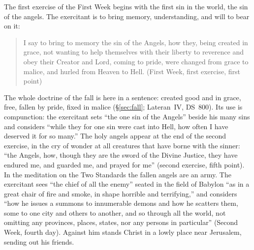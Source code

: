 The first exercise of the First Week begins with the first sin in the
world, the sin of the angels. The exercitant is to bring memory,
understanding, and will to bear on it:
\begin{quote}
I say to bring to memory the sin of the Angels, how they, being created in
grace, not wanting to help themselves with their liberty to reverence and
obey their Creator and Lord, coming to pride, were changed from grace to
malice, and hurled from Heaven to Hell. (First Week, first exercise, first
point)
\end{quote}
The whole doctrine of the fall is here in a sentence: created good and in
grace, free, fallen by pride, fixed in malice (\S\ref{sec:fall}; Lateran~IV,
DS~800). Its use is compunction: the exercitant sets ``the one sin of the
Angels'' beside his many sins and considers ``while they for one sin were
cast into Hell, how often I have deserved it for so many.'' The holy angels
appear at the end of the second exercise, in the cry of wonder at all
creatures that have borne with the sinner: ``the Angels, how, though they are
the sword of the Divine Justice, they have endured me, and guarded me, and
prayed for me'' (second exercise, fifth point). In the meditation on the Two
Standards the fallen angels are an army. The exercitant sees ``the chief of
all the enemy'' seated in the field of Babylon ``as in a great chair of fire
and smoke, in shape horrible and terrifying,'' and considers ``how he issues a
summons to innumerable demons and how he scatters them, some to one city and
others to another, and so through all the world, not omitting any
provinces, places, states, nor any persons in particular'' (Second Week,
fourth day). Against him stands Christ in a lowly place near Jerusalem,
sending out his friends.

